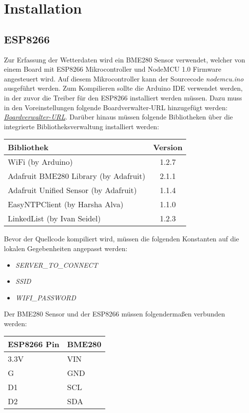 \section{Installation}

\subsection{ESP8266}
Zur Erfassung der Wetterdaten wird ein BME280 Sensor verwendet, welcher von einem Board mit ESP8266 Mikrocontroller und NodeMCU 1.0 Firmware angesteuert wird. Auf diesem Mikrocontroller kann der Sourcecode \textit{nodemcu.ino} ausgeführt werden. Zum Kompilieren sollte die Arduino IDE verwendet werden, in der zuvor die Treiber für den ESP8266 installiert werden müssen. Dazu muss in den Voreinstellungen folgende Boardverwalter-URL hinzugefügt werden: \textit{\href{http://arduino.esp8266.com/stable/package\_esp8266com\_index.json}{Boardverwalter-URL}}. Darüber hinaus müssen folgende Bibliotheken über die integrierte Bibliotheksverwaltung installiert werden:

\begin{tabular}{|l|c|}
	\hline
\textbf{Bibliothek}	& \textbf{Version} \\
	\hline
WiFi (by Arduino)	& 1.2.7 \\
	\hline
Adafruit BME280 Library (by Adafruit)	& 2.1.1 \\
	\hline
Adafruit Unified Sensor (by Adafruit)	& 1.1.4 \\
	\hline
EasyNTPClient (by Harsha Alva)	& 1.1.0 \\
	\hline
LinkedList (by Ivan Seidel)	& 1.2.3 \\
	\hline
\end{tabular}

Bevor der Quellcode kompiliert wird, müssen die folgenden Konstanten auf die lokalen Gegebenheiten angepasst werden:

\begin{itemize}
	\item \textit{SERVER\_TO\_CONNECT}
	\item \textit{SSID}
	\item \textit{WIFI\_PASSWORD}
\end{itemize}

Der BME280 Sensor und der ESP8266 müssen folgendermaßen verbunden werden:

\begin{tabular}{|l|l|}
	\hline
\textbf{ESP8266 Pin}	& \textbf{BME280}  \\
	\hline
	3.3V & VIN \\
	\hline
	G & GND \\
	\hline
	D1 & SCL \\
	\hline
	D2 & SDA \\
	\hline
\end{tabular}

